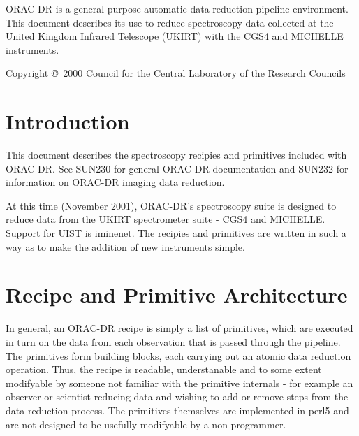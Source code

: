 \documentclass[twoside,11pt]{article}
\newcommand{\stardocinitials}  {SUN}
\newcommand{\stardoccopyright} 
{Copyright \copyright\ 2000 Council for the Central Laboratory of the Research Councils}
\newcommand{\stardocnumber}    {236.0}
\newcommand{\stardocabstract}  {ORAC-DR is a
general-purpose automatic data-reduction pipeline environment.  This
document describes its use to reduce spectroscopy data collected at the
United Kingdom Infrared Telescope (UKIRT) with the CGS4 and MICHELLE
instruments. }
\newcommand{\stardocname}{\stardocinitials /\stardocnumber}
\newenvironment{latexonly}{}{}
\renewcommand{\_}{\texttt{\symbol{95}}}
\renewcommand{\thepage}{\roman{page}}
\begin{document}
\stardocabstract

\begin{latexonly}
\newpage
\vspace*{\fill}
\stardoccopyright
\end{latexonly}

  \newpage
  \begin{latexonly}
    \setlength{\parskip}{0mm}
    \tableofcontents
    \setlength{\parskip}{\medskipamount}
    \markboth{\stardocname}{\stardocname}
  \end{latexonly}

\cleardoublepage
\renewcommand{\thepage}{\arabic{page}}
\setcounter{page}{1}


\section{Introduction}

This document describes the spectroscopy recipies and primitives
included with ORAC-DR. See SUN230 for general ORAC-DR documentation
and SUN232 for information on ORAC-DR imaging data reduction.

At this time (November 2001), ORAC-DR's spectroscopy suite is designed
to reduce data from the UKIRT spectrometer suite - CGS4 and
MICHELLE. Support for UIST is iminenet. The recipies and primitives
are written in such a way as to make the addition of new instruments
simple.

\section{Recipe and Primitive Architecture}

In general, an ORAC-DR recipe is simply a list of primitives, which
are executed in turn on the data from each observation that is passed
through the pipeline. The primitives form building blocks, each
carrying out an atomic data reduction operation. Thus, the recipe is
readable, understanable and to some extent modifyable by someone not
familiar with the primitive internals - for example an observer or
scientist reducing data and wishing to add or remove steps from the
data reduction process. The primitives themselves are implemented in
perl5 and are not designed to be usefully modifyable by a
non-programmer.
\end{document}
